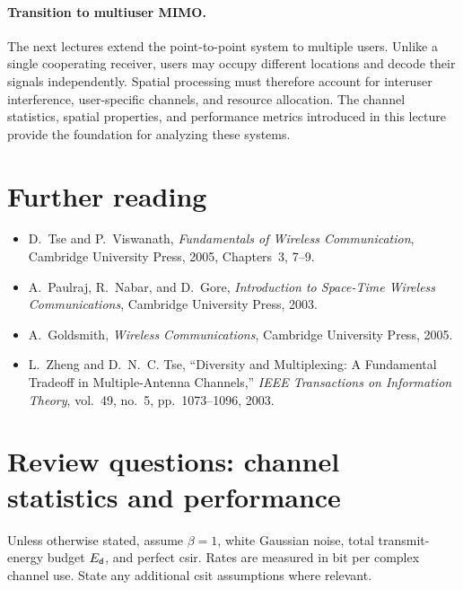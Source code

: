 \paragraph{Transition to multiuser MIMO.}
The next lectures extend the point-to-point system to multiple users. Unlike a single cooperating receiver, users may occupy different locations and decode their signals independently. Spatial processing must therefore account for interuser interference, user-specific channels, and resource allocation. The channel statistics, spatial properties, and performance metrics introduced in this lecture provide the foundation for analyzing these systems.

\section*{Further reading}
\begin{itemize}
	\item D.~Tse and P.~Viswanath, \emph{Fundamentals of Wireless Communication}, Cambridge University Press, 2005, Chapters~3, 7--9.
	\item A.~Paulraj, R.~Nabar, and D.~Gore, \emph{Introduction to Space-Time Wireless Communications}, Cambridge University Press, 2003.
	\item A.~Goldsmith, \emph{Wireless Communications}, Cambridge University Press, 2005.
	\item L.~Zheng and D.~N.~C. Tse, ``Diversity and Multiplexing: A Fundamental Tradeoff in Multiple-Antenna Channels,'' \emph{IEEE Transactions on Information Theory}, vol.~49, no.~5, pp.~1073--1096, 2003.
\end{itemize}

\clearpage

\section*{Review questions: channel statistics and performance}

Unless otherwise stated, assume $\beta=1$, white Gaussian noise, total transmit-energy budget $E_{\mathsf{d}}$, and perfect \ac{csir}. Rates are measured in bit per complex channel use. State any additional \ac{csit} assumptions where relevant.

